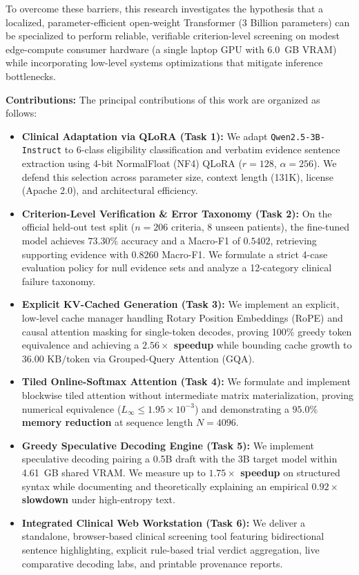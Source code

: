 \documentclass[conference]{IEEEtran}
\begin{document}
To overcome these barriers, this research investigates the hypothesis that a localized, parameter-efficient open-weight Transformer (3 Billion parameters) can be specialized to perform reliable, verifiable criterion-level screening on modest edge-compute consumer hardware (a single laptop GPU with 6.0~GB VRAM) while incorporating low-level systems optimizations that mitigate inference bottlenecks.

\textbf{Contributions:} The principal contributions of this work are organized as follows:
\begin{itemize}
    \item \textbf{Clinical Adaptation via QLoRA (Task 1):} We adapt \texttt{Qwen2.5-3B-Instruct} to 6-class eligibility classification and verbatim evidence sentence extraction using 4-bit NormalFloat (NF4) QLoRA ($r=128$, $\alpha=256$). We defend this selection across parameter size, context length (131K), license (Apache 2.0), and architectural efficiency.
    \item \textbf{Criterion-Level Verification \& Error Taxonomy (Task 2):} On the official held-out test split ($n=206$ criteria, 8 unseen patients), the fine-tuned model achieves \textbf{$73.30\%$} accuracy and a Macro-F1 of \textbf{$0.5402$}, retrieving supporting evidence with \textbf{$0.8260$} Macro-F1. We formulate a strict 4-case evaluation policy for null evidence sets and analyze a 12-category clinical failure taxonomy.
    \item \textbf{Explicit KV-Cached Generation (Task 3):} We implement an explicit, low-level cache manager handling Rotary Position Embeddings (RoPE) and causal attention masking for single-token decodes, proving 100\% greedy token equivalence and achieving a \textbf{$2.56\times$ speedup} while bounding cache growth to $36.00\text{ KB/token}$ via Grouped-Query Attention (GQA).
    \item \textbf{Tiled Online-Softmax Attention (Task 4):} We formulate and implement blockwise tiled attention without intermediate matrix materialization, proving numerical equivalence ($L_\infty \le 1.95 \times 10^{-3}$) and demonstrating a \textbf{$95.0\%$ memory reduction} at sequence length $N=4096$.
    \item \textbf{Greedy Speculative Decoding Engine (Task 5):} We implement speculative decoding pairing a 0.5B draft with the 3B target model within 4.61~GB shared VRAM. We measure up to \textbf{$1.75\times$ speedup} on structured syntax while documenting and theoretically explaining an empirical \textbf{$0.92\times$ slowdown} under high-entropy text.
    \item \textbf{Integrated Clinical Web Workstation (Task 6):} We deliver a standalone, browser-based clinical screening tool featuring bidirectional sentence highlighting, explicit rule-based trial verdict aggregation, live comparative decoding labs, and printable provenance reports.
\end{itemize}
\end{document}
